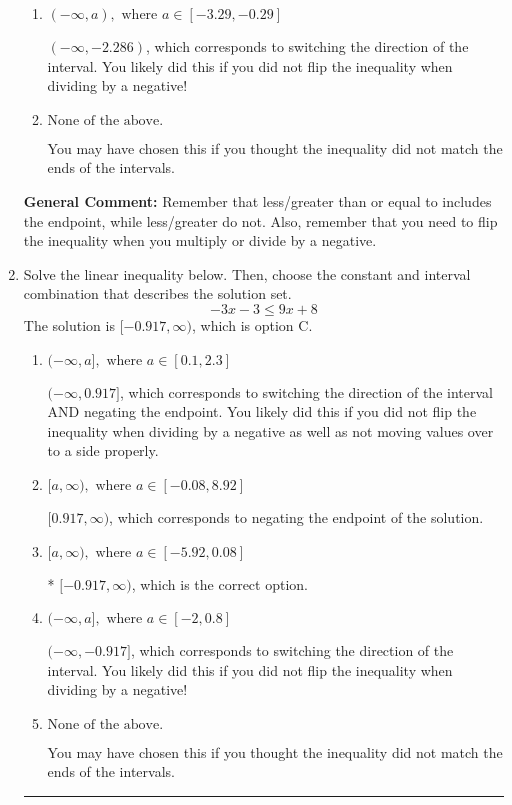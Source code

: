 \documentclass{extbook}[14pt]
\newcommand{\litem}[1]{\item #1

\rule{\textwidth}{0.4pt}}
\begin{document}
\begin{enumerate}
{\begin{enumerate}[label=\Alph*.]
 $(-\infty, 2.286)$, which corresponds to switching the direction of the interval AND negating the endpoint. You likely did this if you did not flip the inequality when dividing by a negative as well as not moving values over to a side properly.
\item \( (-\infty, a), \text{ where } a \in [-3.29, -0.29] \)

 $(-\infty, -2.286)$, which corresponds to switching the direction of the interval. You likely did this if you did not flip the inequality when dividing by a negative!
\item \( \text{None of the above}. \)

You may have chosen this if you thought the inequality did not match the ends of the intervals.
\end{enumerate}

\textbf{General Comment:} Remember that less/greater than or equal to includes the endpoint, while less/greater do not. Also, remember that you need to flip the inequality when you multiply or divide by a negative.
}
\litem{
Solve the linear inequality below. Then, choose the constant and interval combination that describes the solution set.
\[ -3x -3 \leq 9x + 8 \]
The solution is \( [-0.917, \infty) \), which is option C.\begin{enumerate}[label=\Alph*.]
\item \( (-\infty, a], \text{ where } a \in [0.1, 2.3] \)

 $(-\infty, 0.917]$, which corresponds to switching the direction of the interval AND negating the endpoint. You likely did this if you did not flip the inequality when dividing by a negative as well as not moving values over to a side properly.
\item \( [a, \infty), \text{ where } a \in [-0.08, 8.92] \)

 $[0.917, \infty)$, which corresponds to negating the endpoint of the solution.
\item \( [a, \infty), \text{ where } a \in [-5.92, 0.08] \)

* $[-0.917, \infty)$, which is the correct option.
\item \( (-\infty, a], \text{ where } a \in [-2, 0.8] \)

 $(-\infty, -0.917]$, which corresponds to switching the direction of the interval. You likely did this if you did not flip the inequality when dividing by a negative!
\item \( \text{None of the above}. \)

You may have chosen this if you thought the inequality did not match the ends of the intervals.
\end{enumerate}

}
\end{enumerate}
\end{document}
